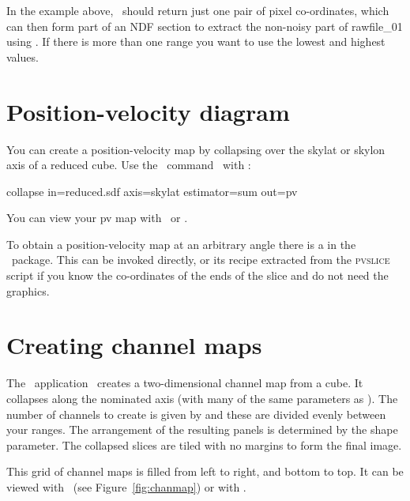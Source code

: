 \documentclass[11pt,oneside,chapters]{starlink}
\providecommand{\chanmap}{\xref{\task{chanmap}}{sun95}{CHANMAP}}
\begin{document}
In the example above, \parget\ should return just one pair of pixel
co-ordinates, which can then form part of an NDF section to extract the
non-noisy part of rawfile\_01 using \ndfcopy. If there is more than one
range you want to use the lowest and highest values.

\section{Position-velocity diagram}

You can create a position-velocity map by collapsing over the skylat
or skylon axis of a reduced cube. Use the \Kappa\ command \collapse\ with
:

\begin{terminalv}
collapse in=reduced.sdf axis=skylat estimator=sum out=pv
\end{terminalv}
You can view your pv map with  \gaia\ or \display.

To obtain a position-velocity map at an arbitrary angle there is a
 in the \datacube\ package.
This can be invoked directly, or its recipe extracted from the
\textsc{pvslice} script if you know the co-ordinates of the ends of
the slice and do not need the graphics.

\section{Creating channel maps}
\label{sec:channel}

The \Kappa\ application \chanmap\ creates a two-dimensional channel
map from a cube. It collapses along the nominated axis (with many of
the same parameters as \collapse). The number of channels to create is
given by  and these are divided evenly between your
ranges. The arrangement of the resulting panels is determined by the
shape parameter. The collapsed slices are tiled with no margins to
form the final image.

\begin{terminalv}
\end{terminalv}
This grid of channel maps is filled from left to right, and bottom to
top. It can be viewed with \gaia\ (see Figure~\ref{fig:chanmap}) or
with \display.
\begin{terminalv}
\end{terminalv}
\end{document}
